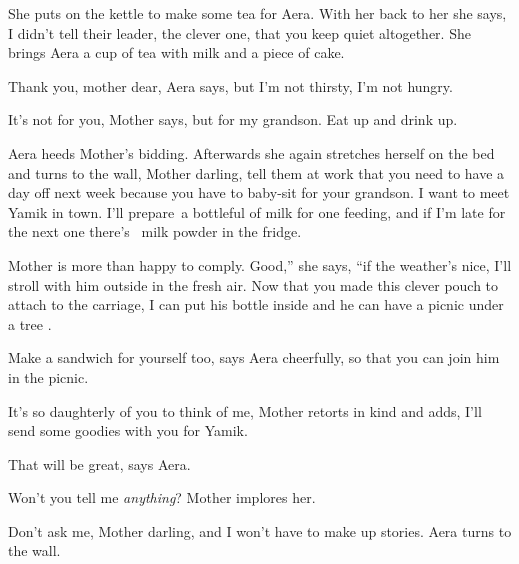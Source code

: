 \documentclass[letterpaper]{article}
\begin{document}
She puts on the kettle to make some tea for Aera. With her back to her she says, {\textquotedbl}I didn't tell their
leader, the clever one, that you keep quiet altogether.{\textquotedbl} She brings Aera a cup of tea with milk and a
piece of cake. 

{\textquotedbl}Thank you, mother dear,{\textquotedbl} Aera says, {\textquotedbl}but I'm not thirsty, I'm not
hungry.{\textquotedbl} 

{\textquotedbl}It's not for you,{\textquotedbl} Mother says, {\textquotedbl}but for my grandson. Eat up and drink
up.{\textquotedbl} 

Aera heeds Mother's bidding. Afterwards she again stretches herself on the bed and turns to the wall,
{\textquotedbl}Mother darling, tell them at work that you need to have a day off next week because you have to baby-sit
for your grandson. I want to meet Yamik in town. I'll prepare~a bottleful of milk for one feeding, and if I'm late for
the next one there's ~milk powder in the fridge.{\textquotedbl}

Mother is more than happy to comply. {\textquotedbl}Good,'' she says, ``if the weather's nice, I'll stroll with him
outside in the fresh air. Now that you made this clever pouch to attach to the carriage, I can put his bottle inside
and he can have a picnic under a tree .{\textquotedbl}

{\textquotedbl}Make a sandwich for yourself too,{\textquotedbl} says Aera cheerfully, {\textquotedbl}so that you can
join him in the picnic.{\textquotedbl} 

{\textquotedbl}It's so daughterly of you to think of me,{\textquotedbl} Mother retorts in kind and adds,
{\textquotedbl}I'll send some goodies with you for Yamik.{\textquotedbl}

{\textquotedbl}That will be great,{\textquotedbl} says Aera.

{\textquotedbl}Won't you tell me \textit{anything}?{\textquotedbl} Mother implores her. 

{\textquotedbl}Don't ask me, Mother darling, and I won't have to make up stories.{\textquotedbl} Aera turns to the wall.
\end{document}
